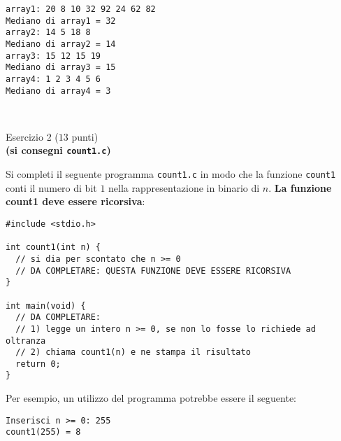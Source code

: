 \documentclass[12pt]{article}
\begin{document}
\begin{mdframed}[backgroundcolor=lightgrey] 
\begin{verbatim}
array1: 20 8 10 32 92 24 62 82 
Mediano di array1 = 32
array2: 14 5 18 8 
Mediano di array2 = 14
array3: 15 12 15 19 
Mediano di array3 = 15
array4: 1 2 3 4 5 6 
Mediano di array4 = 3
\end{verbatim}
\end{mdframed}

\mbox{}\\
\begin{center}{\Large Esercizio 2} ($13$ punti)\\
  \textbf{(si consegni \texttt{count1.c})}\end{center}
%
Si completi il seguente programma \texttt{count1.c} in modo che la funzione
\texttt{count1} conti il numero di bit $1$ nella rappresentazione in binario di $n$.
\textbf{La funzione count1 deve essere ricorsiva}:

\begin{center}
  \begin{lstlisting}[language=myC]
#include <stdio.h>

int count1(int n) {
  // si dia per scontato che n >= 0
  // DA COMPLETARE: QUESTA FUNZIONE DEVE ESSERE RICORSIVA
}

int main(void) {
  // DA COMPLETARE:
  // 1) legge un intero n >= 0, se non lo fosse lo richiede ad oltranza
  // 2) chiama count1(n) e ne stampa il risultato
  return 0;
}
  \end{lstlisting}
\end{center}

Per esempio, un utilizzo del programma potrebbe essere il seguente:

\begin{mdframed}[backgroundcolor=lightgrey] 
\begin{verbatim}
Inserisci n >= 0: 255
count1(255) = 8
\end{verbatim}
\end{mdframed}
\end{document}
